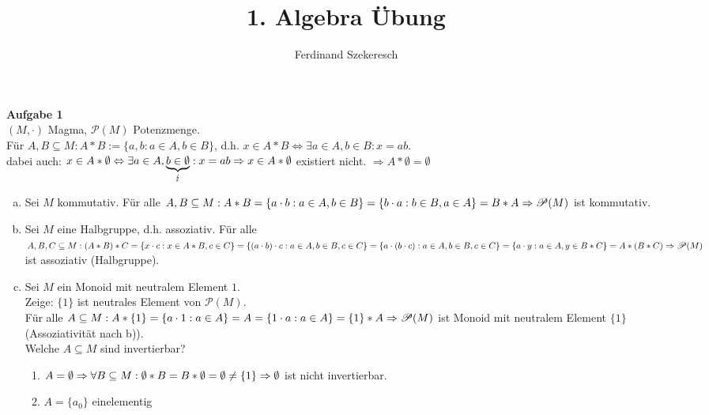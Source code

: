 \documentclass{article}
\title{1. Algebra Übung}
\author{Ferdinand Szekeresch}
\begin{document}
\maketitle
\textbf{Aufgabe 1}\\
$(M,\cdot )$ Magma, $\mathscr{P}(M)$ Potenzmenge.\\
Für $A,B\subseteq M: A*B := \{a,b : a\in A, b\in B\}$, d.h. $x\in A*B \Leftrightarrow \exists a\in A,b\in B: x = ab$.\\
dabei auch: $x\in A*\emptyset \Leftrightarrow\exists a\in A,\underbrace{b\in\emptyset}_\lightning : x=ab\\
\Rightarrow x\in A*\emptyset$ existiert nicht. $\Rightarrow A*\emptyset = \emptyset$
\begin{enumerate}[a)]
\item Sei $M$ kommutativ. Für alle $A,B\subseteq M : A*B = \{a\cdot b : a\in A, b\in B\} = \{b\cdot a: b\in B, a\in A\} = B*A \\
\Rightarrow \mathscr{P}(M)$ ist kommutativ.
\item Sei $M$ eine Halbgruppe, d.h. assoziativ. Für alle $A,B, C \subseteq M: \\
(A*B)*C = \{x\cdot c : x\in A*B, c\in C\} = \{(a\cdot b)\cdot c : a\in A, b\in B, c\in C\} = \{a\cdot(b\cdot c) : a\in A, b\in B, c\in C\}\\
=\{a\cdot y : a\in A, y\in B*C\} = A*(B*C)\\
\Rightarrow \mathscr{P}(M)$ ist assoziativ (Halbgruppe).\\
\item Sei $M$ ein Monoid mit neutralem Element $1$.\\
Zeige: $\{1\}$ ist neutrales Element von $\mathscr{P}(M)$.\\
Für alle $A\subseteq M : A*\{1\} = \{a\cdot 1 : a\in A\} = A = \{1\cdot a : a\in A\} = \{1\}*A\\
\Rightarrow \mathscr{P}(M)$ ist Monoid mit neutralem Element $\{1\}$ (Assoziativität nach b)).\\
Welche $A\subseteq M$ sind invertierbar?\\
\begin{enumerate}[1.{Fall}]
\item $A=\emptyset \\
\Rightarrow \forall B\subseteq M : \emptyset*B = B*\emptyset = \emptyset\neq \{1\}\\
\Rightarrow\emptyset$ ist nicht invertierbar.
\item $A=\{a_0\}$ einelementig\\

\end{enumerate}
\end{enumerate}
\end{document}
